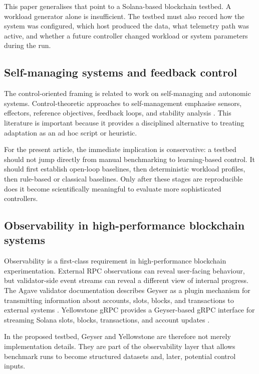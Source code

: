 \documentclass[11pt,a4paper]{article}
\begin{document}
This paper generalises that point to a Solana-based blockchain testbed. A workload generator alone is insufficient. The testbed must also record how the system was configured, which host produced the data, what telemetry path was active, and whether a future controller changed workload or system parameters during the run.

\subsection{Self-managing systems and feedback control}
\label{subsec:related-control}

The control-oriented framing is related to work on self-managing and autonomic systems. Control-theoretic approaches to self-management emphasise sensors, effectors, reference objectives, feedback loops, and stability analysis \cite{diao2005selfmanaging,hellerstein2004selfmanaging}. This literature is important because it provides a disciplined alternative to treating adaptation as an ad hoc script or heuristic.

For the present article, the immediate implication is conservative: a testbed should not jump directly from manual benchmarking to learning-based control. It should first establish open-loop baselines, then deterministic workload profiles, then rule-based or classical baselines. Only after these stages are reproducible does it become scientifically meaningful to evaluate more sophisticated controllers.

\subsection{Observability in high-performance blockchain systems}
\label{subsec:related-observability}

Observability is a first-class requirement in high-performance blockchain experimentation. External RPC observations can reveal user-facing behaviour, but validator-side event streams can reveal a different view of internal progress. The Agave validator documentation describes Geyser as a plugin mechanism for transmitting information about accounts, slots, blocks, and transactions to external systems \cite{anza2026geyser}. Yellowstone gRPC provides a Geyser-based gRPC interface for streaming Solana slots, blocks, transactions, and account updates \cite{rpcpool2026yellowstone}.

In the proposed testbed, Geyser and Yellowstone are therefore not merely implementation details. They are part of the observability layer that allows benchmark runs to become structured datasets and, later, potential control inputs.
\end{document}
